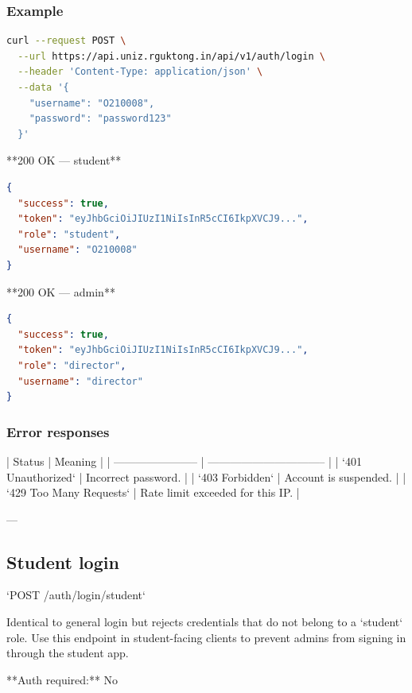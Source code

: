 \subsubsection{Example}

\begin{lstlisting}[language=bash]
curl --request POST \
  --url https://api.uniz.rguktong.in/api/v1/auth/login \
  --header 'Content-Type: application/json' \
  --data '{
    "username": "O210008",
    "password": "password123"
  }'

\end{lstlisting}

**200 OK — student**

\begin{lstlisting}[language=json]
{
  "success": true,
  "token": "eyJhbGciOiJIUzI1NiIsInR5cCI6IkpXVCJ9...",
  "role": "student",
  "username": "O210008"
}

\end{lstlisting}

**200 OK — admin**

\begin{lstlisting}[language=json]
{
  "success": true,
  "token": "eyJhbGciOiJIUzI1NiIsInR5cCI6IkpXVCJ9...",
  "role": "director",
  "username": "director"
}

\end{lstlisting}

\subsubsection{Error responses}

| Status                  | Meaning                          |
| ----------------------- | -------------------------------- |
| `401 Unauthorized`      | Incorrect password.              |
| `403 Forbidden`         | Account is suspended.            |
| `429 Too Many Requests` | Rate limit exceeded for this IP. |

---

\subsection{Student login}

`POST /auth/login/student`

Identical to general login but rejects credentials that do not belong to a `student` role. Use this endpoint in student-facing clients to prevent admins from signing in through the student app.

**Auth required:** No

